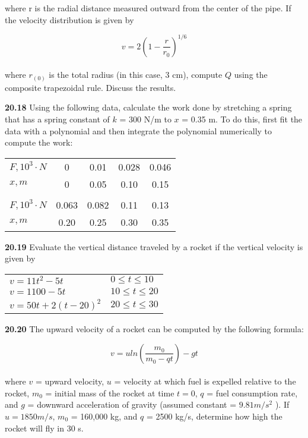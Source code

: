 \documentclass[../main.tex]{subfiles}
\begin{document}
\begin{multicols}{2}
where r is the radial distance measured outward from the
center of the pipe. If the velocity distribution is given by

	$$v = 2 \left( 1- \dfrac{r}{r_{0}} \right)^{1/6}$$\\
where $r_(0)$ is the total radius (in this case, 3 cm), compute $Q$
using the composite trapezoidal rule. Discuss the results.

\textbf{20.18} Using the following data, calculate the work done by
stretching a spring that has a spring constant of $k$ = 300 N/m
to $x$ = 0.35 m. To do this, first fit the data with a polynomial
and then integrate the polynomial numerically to compute
the work:\\
\vspace{0.3in}
\begin{tabular}{lcccc}
\hline
\textbf{$F,10^{3} \cdot N$} & 0 & 0.01 & 0.028 & 0.046\\

\textbf{$x, m$} & 0 & 0.05 & 0.10 & 0.15\\

\vspace{0in}\\

\textbf{$F, 10^{3} \cdot N$} & 0.063 & 0.082 & 0.11 & 0.13\\

\textbf{$x, m$} & 0.20 & 0.25 & 0.30 & 0.35\\ \hline
\end{tabular}

\textbf{20.19} Evaluate the vertical distance traveled by a rocket if
the vertical velocity is given by

\begin{tabular}{ll}
$v=11t^{2} - 5t$ & $0 \leq t \leq 10$\\
$v=1100 - 5t$ & $10 \leq t \leq 20$\\
$v=50t + 2(t-20)^{2}$ & $20 \leq t \leq 30$\\
\end{tabular}

\textbf{20.20} The upward velocity of a rocket can be computed by
the following formula:

	$$v = u ln \left( \dfrac{m_{0}}{m_{0} - qt} \right) - gt$$\\
where $v$ = upward velocity, $u$ = velocity at which fuel is expelled relative to the rocket, $m_{0}$ = initial mass of the rocket
at time $t = 0$, $q$ = fuel consumption rate, and $g$ = downward
acceleration of gravity (assumed constant = $9.81 m/s^{2}$
). If $u = 1850 m/s$, $m_{0}$ = 160,000 kg, and $q$ = 2500 kg/s, determine
how high the rocket will fly in 30 s.


\end{multicols}
\end{document}
